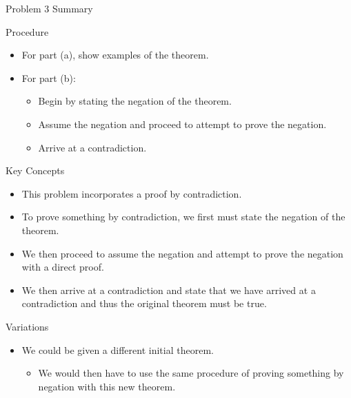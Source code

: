 \begin{summary}{Problem 3 Summary}
    \begin{statement}{Procedure}
        \begin{itemize}
            \item For part (a), show examples of the theorem.
            \item For part (b):
            \begin{itemize}
                \item Begin by stating the negation of the theorem.
                \item Assume the negation and proceed to attempt to prove the negation.
                \item Arrive at a contradiction.
            \end{itemize}
        \end{itemize}
    \end{statement}
    \begin{statement}{Key Concepts}
        \begin{itemize}
            \item This problem incorporates a proof by contradiction.
            \item To prove something by contradiction, we first must state the negation of the theorem.
            \item We then proceed to assume the negation and attempt to prove the negation with a direct proof.
            \item We then arrive at a contradiction and state that we have arrived at a contradiction and thus the original theorem must be true.
        \end{itemize}
    \end{statement}
    \begin{statement}{Variations}
        \begin{itemize}
            \item We could be given a different initial theorem.
            \begin{itemize}
                \item We would then have to use the same procedure of proving something by negation with this new theorem.
            \end{itemize}
        \end{itemize}
    \end{statement}
\end{summary}

